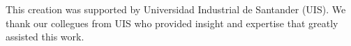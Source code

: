\begin{acknowledgment}
This creation was supported by Universidad Industrial de Santander (UIS). We thank our collegues from UIS who provided insight and expertise that greatly assisted this work. 
\end{acknowledgment}